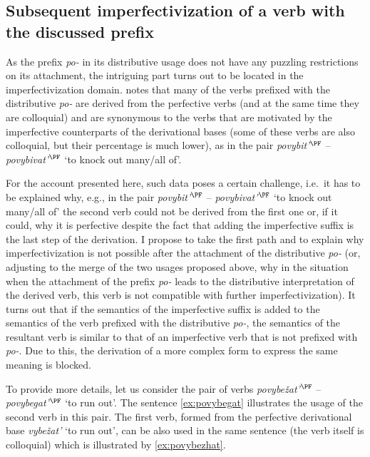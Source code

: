 \subsection{Subsequent imperfectivization of a verb with the discussed prefix}
As the prefix \textit{po-} in its distributive usage does not have any puzzling restrictions on its attachment, the intriguing part turns out to be located in the imperfectivization domain. \citet[365]{Shvedova:82} notes that many of the verbs prefixed with the distributive \textit{po-} are derived from the perfective verbs (and at the same time they are colloquial) and are synonymous to the verbs that are motivated by the imperfective counterparts of the derivational bases (some of these verbs are also colloquial, but their percentage is much lower), as in the pair \textit{povybit'}$^{\PF}$ -- \textit{povybivat'}$^{\PF}$ `to knock out many/all of'.

For the account presented here, such data poses a certain challenge, i.e.\ it has to be explained why, e.g., in the pair \textit{povybit'}$^{\PF}$ -- \textit{povybivat'}$^{\PF}$ `to knock out many/all of' the second verb could not be derived from the first one or, if it could, why it is perfective despite the fact that adding the imperfective suffix is the last step of the derivation. I propose to take the first path and to explain why imperfectivization is not possible after the attachment of the distributive \textit{po-} (or, adjusting to the merge of the two usages proposed above, why in the situation when the attachment of the prefix \textit{po-} leads to the distributive interpretation of the derived verb, this verb is not compatible with further imperfectivization). It turns out that if the semantics of the imperfective suffix is added to the semantics of the verb prefixed with the distributive \textit{po-}, the semantics of the resultant verb is similar to that of an imperfective verb that is not prefixed with \textit{po-}. Due to this, the derivation of a more complex form to express the same meaning is blocked.

To provide more details, let us consider the pair of verbs \textit{povybe\v{z}at'}$^{\PF}$ -- \textit{po\-vy\-be\-gat'}$^{\PF}$ `to run out'. The sentence \ref{ex:povybegat} illustrates the usage of the second verb in this pair. The first verb, formed from the perfective derivational base \textit{vybe\v{z}at'} `to run out', can be also used in the same sentence (the verb itself is colloquial) which is illustrated by \ref{ex:povybezhat}.

